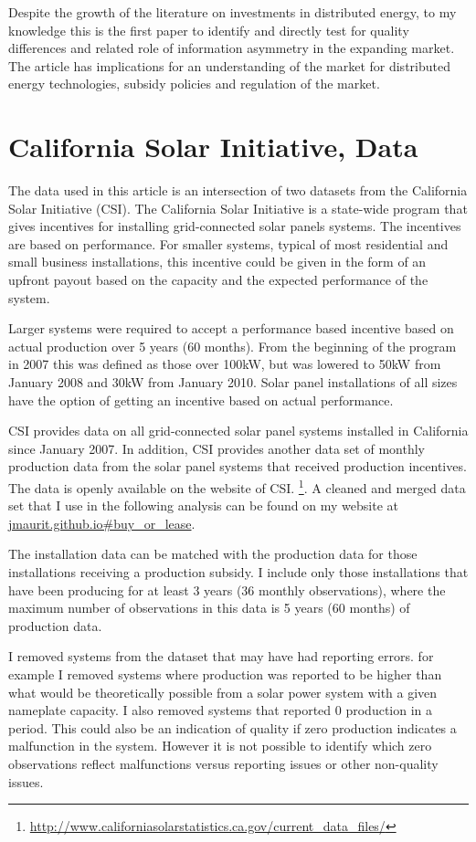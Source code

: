 \documentclass[12pt]{article}
\begin{document}
Despite the growth of the literature on investments in distributed energy, to my knowledge this is the first paper to identify and directly test for quality differences and related role of information asymmetry in the expanding market. The article has implications for an understanding of the market for distributed energy technologies, subsidy policies and regulation of the market.

\section{California Solar Initiative, Data}

The data used in this article is an intersection of two datasets from the California Solar Initiative (CSI). The California Solar Initiative is a state-wide program that gives incentives for installing grid-connected solar panels systems. The incentives are based on performance. For smaller systems, typical of most residential and small business installations, this incentive could be given in the form of an upfront payout based on the capacity and the expected performance of the system.

Larger systems were required to accept a performance based incentive based on actual production over 5 years (60 months). From the beginning of the program in 2007 this was defined as those over 100kW, but was lowered to 50kW from January 2008 and 30kW from January 2010. Solar panel installations of all sizes have the option of getting an incentive based on actual performance.

CSI provides data on all grid-connected solar panel systems installed in California since January 2007. In addition, CSI provides another data set of monthly production data from the solar panel systems that received production incentives. The data is openly available on the website of CSI. \footnote{\url{http://www.californiasolarstatistics.ca.gov/current_data_files/}}. A cleaned and merged data set that I use in the following analysis can be found on my website at \url{jmaurit.github.io#buy_or_lease}.

The installation data can be matched with the production data for those installations receiving a production subsidy. I include only those installations that have been producing for at least 3 years (36 monthly observations), where the maximum number of observations in this data is 5 years (60 months) of production data.

I removed systems from the dataset that may have had reporting errors. for example I removed systems where production was reported to be higher than what would be theoretically possible from a solar power system with a given nameplate capacity. I also removed systems that reported 0 production in a period. This could also be an indication of quality if zero production indicates a malfunction in the system. However it is not possible to identify which zero observations reflect malfunctions versus reporting issues or other non-quality issues.
\end{document}

